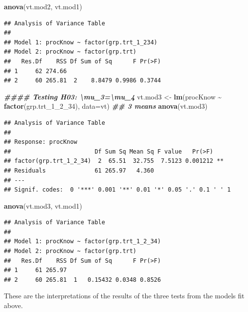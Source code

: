 \documentclass[
]{book}
\newenvironment{Shaded}{\begin{snugshade}}{\end{snugshade}}
\newcommand{\AttributeTok}[1]{\textcolor[rgb]{0.13,0.29,0.53}{#1}}
\newcommand{\DocumentationTok}[1]{\textcolor[rgb]{0.56,0.35,0.01}{\textbf{\textit{#1}}}}
\newcommand{\FunctionTok}[1]{\textcolor[rgb]{0.13,0.29,0.53}{\textbf{#1}}}
\newcommand{\NormalTok}[1]{#1}
\newcommand{\OtherTok}[1]{\textcolor[rgb]{0.56,0.35,0.01}{#1}}
\newcommand{\SpecialCharTok}[1]{\textcolor[rgb]{0.81,0.36,0.00}{\textbf{#1}}}
\begin{document}
\begin{Shaded}
\begin{Highlighting}[]
\FunctionTok{anova}\NormalTok{(vt.mod2, vt.mod1)}
\end{Highlighting}
\end{Shaded}

\begin{verbatim}
## Analysis of Variance Table
## 
## Model 1: procKnow ~ factor(grp.trt_1_234)
## Model 2: procKnow ~ factor(grp.trt)
##   Res.Df    RSS Df Sum of Sq      F Pr(>F)
## 1     62 274.66                           
## 2     60 265.81  2    8.8479 0.9986 0.3744
\end{verbatim}

\begin{Shaded}
\begin{Highlighting}[]
\DocumentationTok{\#\#\#\# Testing H03: \textbackslash{}mu\_3=\textbackslash{}mu\_4}
\NormalTok{vt.mod3 }\OtherTok{\textless{}{-}} \FunctionTok{lm}\NormalTok{(procKnow }\SpecialCharTok{\textasciitilde{}} \FunctionTok{factor}\NormalTok{(grp.trt\_1\_2\_34), }\AttributeTok{data=}\NormalTok{vt)   }\DocumentationTok{\#\# 3 means}
\FunctionTok{anova}\NormalTok{(vt.mod3)}
\end{Highlighting}
\end{Shaded}

\begin{verbatim}
## Analysis of Variance Table
## 
## Response: procKnow
##                        Df Sum Sq Mean Sq F value   Pr(>F)   
## factor(grp.trt_1_2_34)  2  65.51  32.755  7.5123 0.001212 **
## Residuals              61 265.97   4.360                    
## ---
## Signif. codes:  0 '***' 0.001 '**' 0.01 '*' 0.05 '.' 0.1 ' ' 1
\end{verbatim}

\begin{Shaded}
\begin{Highlighting}[]
\FunctionTok{anova}\NormalTok{(vt.mod3, vt.mod1)}
\end{Highlighting}
\end{Shaded}

\begin{verbatim}
## Analysis of Variance Table
## 
## Model 1: procKnow ~ factor(grp.trt_1_2_34)
## Model 2: procKnow ~ factor(grp.trt)
##   Res.Df    RSS Df Sum of Sq      F Pr(>F)
## 1     61 265.97                           
## 2     60 265.81  1   0.15432 0.0348 0.8526
\end{verbatim}

These are the interpretations of the results of the three tests from the
models fit above.
\end{document}
